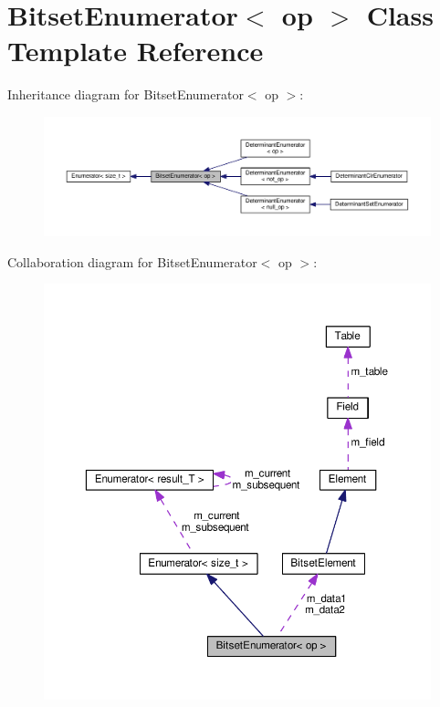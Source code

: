 \hypertarget{classBitsetEnumerator}{}\section{Bitset\+Enumerator$<$ op $>$ Class Template Reference}
\label{classBitsetEnumerator}


Inheritance diagram for Bitset\+Enumerator$<$ op $>$\+:
\nopagebreak
\begin{figure}[H]
\begin{center}
\leavevmode
\includegraphics[width=350pt]{classBitsetEnumerator__inherit__graph}
\end{center}
\end{figure}


Collaboration diagram for Bitset\+Enumerator$<$ op $>$\+:
\nopagebreak
\begin{figure}[H]
\begin{center}
\leavevmode
\includegraphics[width=350pt]{classBitsetEnumerator__coll__graph}
\end{center}
\end{figure}

